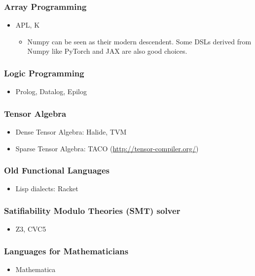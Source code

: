 \documentclass{article}
\begin{document}
\subsubsection*{Array Programming}
\begin{itemize}
    \item APL, K
    \begin{itemize}
        \item Numpy can be seen as their modern descendent.
        Some DSLs derived from Numpy like PyTorch and JAX are also good choices.
    \end{itemize}
\end{itemize}

\subsubsection*{Logic Programming}
\begin{itemize}
    \item Prolog, Datalog, Epilog
\end{itemize}

\subsubsection*{Tensor Algebra}
\begin{itemize}
    \item Dense Tensor Algebra: Halide, TVM
    \item Sparse Tensor Algebra: TACO (\href{http://tensor-compiler.org/}{http://tensor-compiler.org/})
\end{itemize}

\subsubsection{Old Functional Languages}
\begin{itemize}
    \item Lisp dialects: Racket
\end{itemize}

\subsubsection*{Satifiability Modulo Theories (SMT) solver}
\begin{itemize}
    \item Z3, CVC5
\end{itemize}

\subsubsection*{Languages for Mathematicians}
\begin{itemize}
    \item Mathematica
\end{itemize}
    
\end{document}
